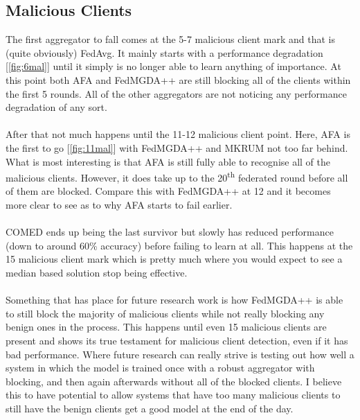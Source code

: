 \subsection{Malicious Clients}
The first aggregator to fall comes at the 5-7 malicious client mark and that is (quite obviously) FedAvg.
It mainly starts with a performance degradation [\ref{fig:6mal}] until it simply is no longer able to learn anything of importance.
At this point both AFA and FedMGDA++ are still blocking all of the clients within the first 5 rounds.
All of the other aggregators are not noticing any performance degradation of any sort.
\\ \\
After that not much happens until the 11-12 malicious client point.
Here, AFA is the first to go [\ref{fig:11mal}] with FedMGDA++ and MKRUM not too far behind.
What is most interesting is that AFA is still fully able to recognise all of the malicious clients.
However, it does take up to the 20\textsuperscript{th} federated round before all of them are blocked.
Compare this with FedMGDA++ at 12 and it becomes more clear to see as to why AFA starts to fail earlier.
\\ \\
COMED ends up being the last survivor but slowly has reduced performance (down to around 60\% accuracy) before failing to learn at all.
This happens at the 15 malicious client mark which is pretty much where you would expect to see a median based solution stop being effective.
\\ \\
Something that has place for future research work is how FedMGDA++ is able to still block the majority of malicious clients while not really blocking any benign ones in the process.
This happens until even 15 malicious clients are present and shows its true testament for malicious client detection, even if it has bad performance.
Where future research can really strive is testing out how well a system in which the model is trained once with a robust aggregator with blocking, and then again afterwards without all of the blocked clients.
I believe this to have potential to allow systems that have too many malicious clients to still have the benign clients get a good model at the end of the day.



